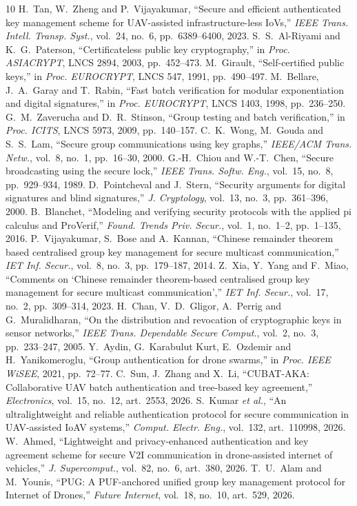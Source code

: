 \documentclass[conference]{IEEEtran}
\begin{document}
\begin{thebibliography}{10}
 H.~Tan, W.~Zheng and P.~Vijayakumar, ``Secure and efficient authenticated key management scheme for UAV-assisted infrastructure-less IoVs,''
  \emph{IEEE Trans. Intell. Transp. Syst.}, vol.~24, no.~6, pp.~6389--6400, 2023.
 S.~S.~Al-Riyami and K.~G.~Paterson, ``Certificateless public key cryptography,'' in \emph{Proc. ASIACRYPT}, LNCS 2894, 2003, pp.~452--473.
 M.~Girault, ``Self-certified public keys,'' in \emph{Proc. EUROCRYPT}, LNCS 547, 1991, pp.~490--497.
 M.~Bellare, J.~A.~Garay and T.~Rabin, ``Fast batch verification for modular exponentiation and digital signatures,'' in \emph{Proc. EUROCRYPT},
  LNCS 1403, 1998, pp.~236--250.
 G.~M.~Zaverucha and D.~R.~Stinson, ``Group testing and batch verification,'' in \emph{Proc. ICITS}, LNCS 5973, 2009, pp.~140--157.
 C.~K.~Wong, M.~Gouda and S.~S.~Lam, ``Secure group communications using key graphs,'' \emph{IEEE/ACM Trans. Netw.}, vol.~8, no.~1, pp.~16--30, 2000.
 G.-H.~Chiou and W.-T.~Chen, ``Secure broadcasting using the secure lock,'' \emph{IEEE Trans. Softw. Eng.}, vol.~15, no.~8, pp.~929--934, 1989.
 D.~Pointcheval and J.~Stern, ``Security arguments for digital signatures and blind signatures,'' \emph{J. Cryptology}, vol.~13, no.~3,
  pp.~361--396, 2000.
 B.~Blanchet, ``Modeling and verifying security protocols with the applied pi calculus and ProVerif,'' \emph{Found. Trends Priv. Secur.},
  vol.~1, no.~1--2, pp.~1--135, 2016.
 P.~Vijayakumar, S.~Bose and A.~Kannan, ``Chinese remainder theorem based centralised group key management for secure multicast communication,'' \emph{IET Inf. Secur.}, vol.~8, no.~3, pp.~179--187, 2014.
 Z.~Xia, Y.~Yang and F.~Miao, ``Comments on `Chinese remainder theorem-based centralised group key management for secure multicast communication','' \emph{IET Inf. Secur.}, vol.~17, no.~2, pp.~309--314, 2023.
 H.~Chan, V.~D.~Gligor, A.~Perrig and G.~Muralidharan, ``On the distribution and revocation of cryptographic keys in sensor networks,'' \emph{IEEE Trans. Dependable Secure Comput.}, vol.~2, no.~3, pp.~233--247, 2005.
 Y.~Aydin, G.~Karabulut Kurt, E.~Ozdemir and H.~Yanikomeroglu, ``Group authentication for drone swarms,'' in \emph{Proc. IEEE WiSEE}, 2021, pp.~72--77.
 C.~Sun, J.~Zhang and X.~Li, ``CUBAT-AKA: Collaborative UAV batch authentication and tree-based key agreement,'' \emph{Electronics}, vol.~15, no.~12, art.~2553, 2026.
 S.~Kumar \textit{et al.}, ``An ultralightweight and reliable authentication protocol for secure communication in UAV-assisted IoAV systems,'' \emph{Comput. Electr. Eng.}, vol.~132, art.~110998, 2026.
 W.~Ahmed, ``Lightweight and privacy-enhanced authentication and key agreement scheme for secure V2I communication in drone-assisted internet of vehicles,'' \emph{J. Supercomput.}, vol.~82, no.~6, art.~380, 2026.
 T.~U.~Alam and M.~Younis, ``PUG: A PUF-anchored unified group key management protocol for Internet of Drones,'' \emph{Future Internet}, vol.~18, no.~10, art.~529, 2026.
\end{thebibliography}
\end{document}

